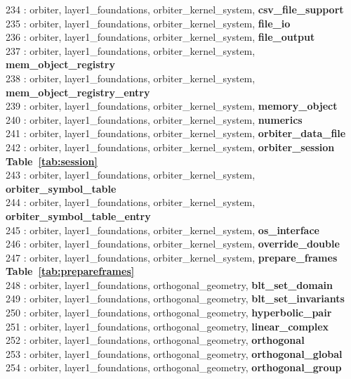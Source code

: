 234 : orbiter, layer1\_foundations, orbiter\_kernel\_system, {\bf csv\_file\_support}\\
235 : orbiter, layer1\_foundations, orbiter\_kernel\_system, {\bf file\_io}\\
236 : orbiter, layer1\_foundations, orbiter\_kernel\_system, {\bf file\_output}\\
237 : orbiter, layer1\_foundations, orbiter\_kernel\_system, {\bf mem\_object\_registry}\\
238 : orbiter, layer1\_foundations, orbiter\_kernel\_system, {\bf mem\_object\_registry\_entry}\\
239 : orbiter, layer1\_foundations, orbiter\_kernel\_system, {\bf memory\_object}\\
240 : orbiter, layer1\_foundations, orbiter\_kernel\_system, {\bf numerics}\\
241 : orbiter, layer1\_foundations, orbiter\_kernel\_system, {\bf orbiter\_data\_file}\\
242 : orbiter, layer1\_foundations, orbiter\_kernel\_system, {\bf orbiter\_session Table~\ref{tab:session}}\\
243 : orbiter, layer1\_foundations, orbiter\_kernel\_system, {\bf orbiter\_symbol\_table}\\
244 : orbiter, layer1\_foundations, orbiter\_kernel\_system, {\bf orbiter\_symbol\_table\_entry}\\
245 : orbiter, layer1\_foundations, orbiter\_kernel\_system, {\bf os\_interface}\\
246 : orbiter, layer1\_foundations, orbiter\_kernel\_system, {\bf override\_double}\\
247 : orbiter, layer1\_foundations, orbiter\_kernel\_system, {\bf prepare\_frames Table~\ref{tab:prepareframes}}\\
248 : orbiter, layer1\_foundations, orthogonal\_geometry, {\bf blt\_set\_domain}\\
249 : orbiter, layer1\_foundations, orthogonal\_geometry, {\bf blt\_set\_invariants}\\
250 : orbiter, layer1\_foundations, orthogonal\_geometry, {\bf hyperbolic\_pair}\\
251 : orbiter, layer1\_foundations, orthogonal\_geometry, {\bf linear\_complex}\\
252 : orbiter, layer1\_foundations, orthogonal\_geometry, {\bf orthogonal}\\
253 : orbiter, layer1\_foundations, orthogonal\_geometry, {\bf orthogonal\_global}\\
254 : orbiter, layer1\_foundations, orthogonal\_geometry, {\bf orthogonal\_group}\\
